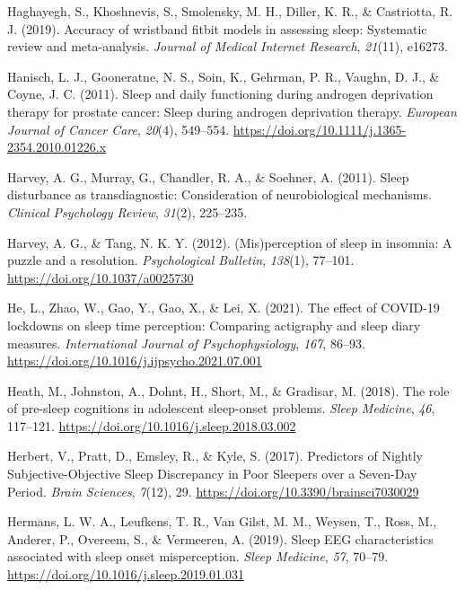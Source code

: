 \documentclass[
]{article}
\newlength{\cslhangindent}
\newenvironment{CSLReferences}[2] %
 {\begin{list}{}{%
  \setlength{\itemindent}{0pt}
  \setlength{\leftmargin}{0pt}
  \setlength{\parsep}{0pt}
  \ifodd #1
   \setlength{\leftmargin}{\cslhangindent}
   \setlength{\itemindent}{-1\cslhangindent}
  \fi
  \setlength{\itemsep}{#2\baselineskip}}}
 {\end{list}}
\begin{document}
\begin{CSLReferences}{1}{0}
Haghayegh, S., Khoshnevis, S., Smolensky, M. H., Diller, K. R., \& Castriotta, R. J. (2019). Accuracy of wristband fitbit models in assessing sleep: Systematic review and meta-analysis. \emph{Journal of Medical Internet Research}, \emph{21}(11), e16273.

Hanisch, L. J., Gooneratne, N. S., Soin, K., Gehrman, P. R., Vaughn, D. J., \& Coyne, J. C. (2011). Sleep and daily functioning during androgen deprivation therapy for prostate cancer: {Sleep} during androgen deprivation therapy. \emph{European Journal of Cancer Care}, \emph{20}(4), 549--554. \url{https://doi.org/10.1111/j.1365-2354.2010.01226.x}

Harvey, A. G., Murray, G., Chandler, R. A., \& Soehner, A. (2011). Sleep disturbance as transdiagnostic: Consideration of neurobiological mechanisms. \emph{Clinical Psychology Review}, \emph{31}(2), 225--235.

Harvey, A. G., \& Tang, N. K. Y. (2012). {(Mis)perception of sleep in insomnia: A puzzle and a resolution.} \emph{Psychological Bulletin}, \emph{138}(1), 77--101. \url{https://doi.org/10.1037/a0025730}

He, L., Zhao, W., Gao, Y., Gao, X., \& Lei, X. (2021). The effect of {COVID}-19 lockdowns on sleep time perception: {Comparing} actigraphy and sleep diary measures. \emph{International Journal of Psychophysiology}, \emph{167}, 86--93. \url{https://doi.org/10.1016/j.ijpsycho.2021.07.001}

Heath, M., Johnston, A., Dohnt, H., Short, M., \& Gradisar, M. (2018). The role of pre-sleep cognitions in adolescent sleep-onset problems. \emph{Sleep Medicine}, \emph{46}, 117--121. \url{https://doi.org/10.1016/j.sleep.2018.03.002}

Herbert, V., Pratt, D., Emsley, R., \& Kyle, S. (2017). Predictors of {Nightly} {Subjective}-{Objective} {Sleep} {Discrepancy} in {Poor} {Sleepers} over a {Seven}-{Day} {Period}. \emph{Brain Sciences}, \emph{7}(12), 29. \url{https://doi.org/10.3390/brainsci7030029}

Hermans, L. W. A., Leufkens, T. R., Van Gilst, M. M., Weysen, T., Ross, M., Anderer, P., Overeem, S., \& Vermeeren, A. (2019). Sleep {EEG} characteristics associated with sleep onset misperception. \emph{Sleep Medicine}, \emph{57}, 70--79. \url{https://doi.org/10.1016/j.sleep.2019.01.031}


\end{CSLReferences}
\end{document}
